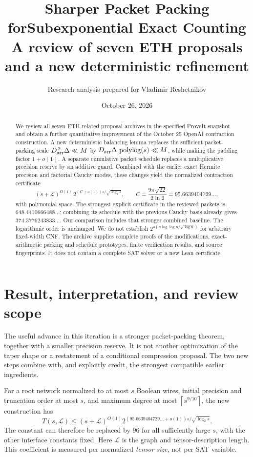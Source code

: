 \documentclass[11pt,letterpaper]{article}
\title{\color{navy}\LARGE Sharper Packet Packing for\newline Subexponential Exact Counting\\[.4em]
\large A review of seven ETH proposals and a new deterministic refinement}
\author{Research analysis prepared for Vladimir Reshetnikov}
\date{October 26, 2026}
\numberwithin{equation}{section}
\theoremstyle{definition}\newtheorem{definition}[theorem]{Definition}
\theoremstyle{remark}\newtheorem{remark}[theorem]{Remark}
\newcommand{\polylog}{\operatorname{polylog}}
\newcommand{\ceil}[1]{\left\lceil #1\right\rceil}
\newcommand{\LL}{\mathcal L}
\begin{document}
\maketitle
\begin{abstract}
We review all seven ETH-related proposal archives in the specified ProveIt snapshot and obtain a further quantitative improvement of the October 25 OpenAI contraction construction. A new deterministic balancing lemma replaces the sufficient packet-packing scale $D_{\rm arr}^{\,2}\Delta\ll M$ by $D_{\rm arr}\Delta\,\polylog(s)\ll M$, while making the padding factor $1+o(1)$. A separate cumulative packet schedule replaces a multiplicative precision reserve by an additive guard. Combined with the earlier exact Hermite precision and factorial Cauchy modes, these changes yield the normalized contraction certificate
\[
 (s+\LL)^{O(1)}\,2^{(C+o(1))s/\sqrt{\log_2 s}},\qquad
 C=\frac{9\pi\sqrt{22}}{2\ln2}=95.6639404729\ldots,
\]
with polynomial space. The strongest explicit certificate in the reviewed packets is $648.4410666488\ldots$; combining its schedule with the previous Cauchy basis already gives $374.3776243833\ldots$. Our comparison includes that stronger combined baseline. The logarithmic order is unchanged. We do not establish $2^{o(n\log\log n/\sqrt{\log n})}$ for arbitrary fixed-width CNF. The archive supplies complete proofs of the modifications, exact-arithmetic packing and schedule prototypes, finite verification results, and source fingerprints. It does not contain a complete SAT solver or a new Lean certificate.
\end{abstract}
\setcounter{tocdepth}{1}
\begingroup\small\setlength{\parskip}{0pt}
\makeatletter
\renewcommand{\l@section}[2]{\@dottedtocline{1}{0em}{1.6em}{\textbf{#1}}{\textbf{#2}}}
\makeatother
\tableofcontents
\endgroup
\clearpage

\section{Result, interpretation, and review scope}
\label{sec:overview}

The useful advance in this iteration is a stronger packet-packing theorem, together with a smaller precision reserve. It is not another optimization of the taper shape or a restatement of a conditional compression proposal. The two new steps combine with, and explicitly credit, the strongest compatible earlier ingredients.

For a root network normalized to at most $s$ Boolean wires, initial precision and truncation order at most $s$, and maximum degree at most $\ceil{s^{9/10}}$, the new construction has
\begin{equation}\label{eq:headline}
 T(s,\LL)\le(s+\LL)^{O(1)}
 2^{\left(95.6639404729\ldots+o(1)\right)s/\sqrt{\log_2s}}.
\end{equation}
The constant can therefore be replaced by $96$ for all sufficiently large $s$, with the other interface constants fixed. Here $\LL$ is the graph and tensor-description length. This coefficient is measured per normalized \emph{tensor size}, not per SAT variable.
\end{document}
